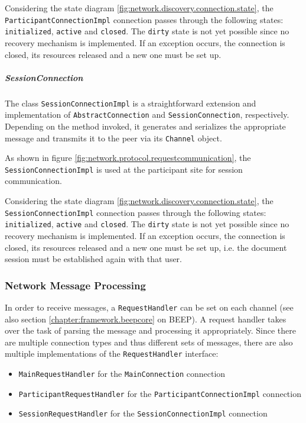 Considering the state diagram \ref{fig:network.discovery.connection.state}, the \texttt{ParticipantConnectionImpl} connection passes through the following states: \texttt{initialized}, \texttt{active} and \texttt{closed}. The \texttt{dirty} state is not yet possible since no recovery mechanism is implemented. If an exception occurs, the connection is closed, its resources released and a new one must be set up.

\subparagraph{SessionConnection}
The class \texttt{SessionConnectionImpl} is a straightforward extension and implementation of \texttt{AbstractConnection} and \texttt{SessionConnection}, respectively. Depending on the method invoked, it generates and serializes the appropriate message and transmits it to the peer via its \texttt{Channel} object.

As shown in figure \ref{fig:network.protocol.requestcommunication}, the \texttt{SessionConnectionImpl} is used at the participant site for session communication.

Considering the state diagram \ref{fig:network.discovery.connection.state}, the \texttt{SessionConnectionImpl} connection passes through the following states: \texttt{initialized}, \texttt{active} and \texttt{closed}. The \texttt{dirty} state is not yet possible since no recovery mechanism is implemented. If an exception occurs, the connection is closed, its resources released and a new one must be set up, i.e. the document session must be established again with that user.

\subsubsection{Network Message Processing}
In order to receive messages, a \texttt{RequestHandler} can be set on each channel (see also section \ref{chapter:framework.beepcore} on BEEP). A request handler takes over the task of parsing the message and processing it appropriately. Since there are multiple connection types and thus different sets of messages, there are also multiple implementations of the \texttt{RequestHandler} interface:

\begin{itemize}
 \item \texttt{MainRequestHandler} for the  \texttt{MainConnection} connection
 \item \texttt{ParticipantRequestHandler} for the \texttt{ParticipantConnectionImpl} connection
 \item \texttt{SessionRequestHandler} for the \texttt{SessionConnectionImpl} connection
\end{itemize}


